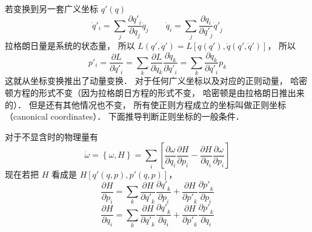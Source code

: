 若变换到另一套广义坐标 $q'(q)$
\begin{equation}
{\dot q'_i} = \sum\limits_j {\frac{{\partial {{q'}_i}}}{{\partial {q_j}}}{{\dot q}_j}} \qquad
{\dot q_i} = \sum\limits_j {\frac{{\partial {q_i}}}{{\partial {{q'}_j}}}{{\dot q'}_j}}
\end{equation}
拉格朗日量是系统的状态量， 所以 $L(q',\dot q') = L[q(q'),\dot q(q',\dot q')]$，  所以
  \begin{equation}
{p'_i} = \frac{{\partial L}}{{\partial {{\dot q'}_i}}} = \sum\limits_k {\frac{{\partial L}}{{\partial {{\dot q}_k}}}\frac{{\partial {{\dot q}_k}}}{{\partial {{\dot q'}_i}}}}  = \sum\limits_k {\frac{{\partial {q_k}}}{{\partial {{q'}_i}}}{p_k}} 
\end{equation}
这就从坐标变换推出了动量变换． 对于任何广义坐标以及对应的正则动量， 哈密顿方程的形式不变（因为拉格朗日方程的形式不变， 哈密顿是由拉格朗日推出来的）． 但是还有其他情况也不变， 所有使正则方程成立的坐标叫做正则坐标（canonical coordinates）． 下面推导判断正则坐标的一般条件．

对于不显含时的物理量有
  \begin{equation}
\dot \omega  = \left\{ {\omega ,H} \right\} = \sum\limits_i {\left[ {\frac{{\partial \omega }}{{\partial {q_i}}}\frac{{\partial H}}{{\partial {p_i}}} - \frac{{\partial H}}{{\partial {q_i}}}\frac{{\partial \omega }}{{\partial {p_i}}}} \right]} 
\end{equation}
现在若把 $H$ 看成是 $H[q'(q,p),p'(q,p)]$，  
  \begin{equation}
\frac{{\partial H}}{{\partial {p_i}}} = \sum\limits_k {\frac{{\partial H}}{{\partial {{q'}_k}}}\frac{{\partial {{q'}_k}}}{{\partial {p_i}}} + \frac{{\partial H}}{{\partial {{p'}_k}}}\frac{{\partial {{p'}_k}}}{{\partial {p_i}}}} 
\end{equation}
 \begin{equation}
\frac{{\partial H}}{{\partial {q_i}}} = \sum\limits_k {\frac{{\partial H}}{{\partial {{q'}_k}}}\frac{{\partial {{q'}_k}}}{{\partial {q_i}}} + \frac{{\partial H}}{{\partial {{p'}_k}}}\frac{{\partial {{p'}_k}}}{{\partial {q_i}}}} 
\end{equation}
 
